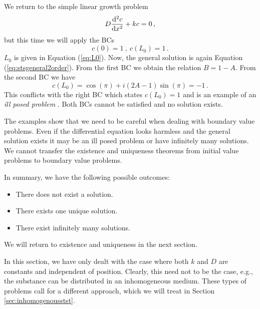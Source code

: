 \begin{example}
  We return to the simple linear growth problem 
  \begin{equation}
    D\frac{\mathrm{d}^2c}{\mathrm{d} x^2} + kc=0 \, , 
  \end{equation}
  but this time we will apply the BCs
  \begin{equation}
    c(0) = 1 \ , \ c(L_0) = 1 \, .
  \end{equation}
  $L_0$ is given in Equation (\ref{eq:L0}).  Now, the general solution is again 
	Equation (\ref{eq:stsgeneral2order}). 
	From the first BC we obtain the relation $B=1-A$. From the second BC we have 
  \begin{equation}
    c(L_0)=\cos(\pi) + i(2A-1)\sin(\pi) = -1 \, .
  \end{equation}
	This conflicts with the right BC which states $c(L_0)=1$ 
	and is an example of an \emph{ill posed problem} . Both BCs cannot be satisfied and no solution exists.
\end{example}

The examples show that we need to be careful when dealing with boundary value problems. 
Even if the differential 
equation looks harmless and the general solution exists it may be an ill posed problem or 
have infinitely many solutions. We cannot transfer the existence and uniqueness 
theorems from initial value problems to boundary value problems. 

In summary, we have the following possible outcomes:
\begin{itemize}
\item There does not exist a solution.
\item There exists one unique solution. 
\item There exist infinitely many solutions.
\end{itemize}
We will return to existence and uniqueness in the next section.

In this section, we have only dealt with the case where both $k$ and $D$ are constants and
independent of position. Clearly, this need not to be the case, e.g., 
the substance can be distributed in an inhomogeneous medium. These types of
problems call for a different approach, which we will treat in Section \ref{sec:inhomogenousstst}.

